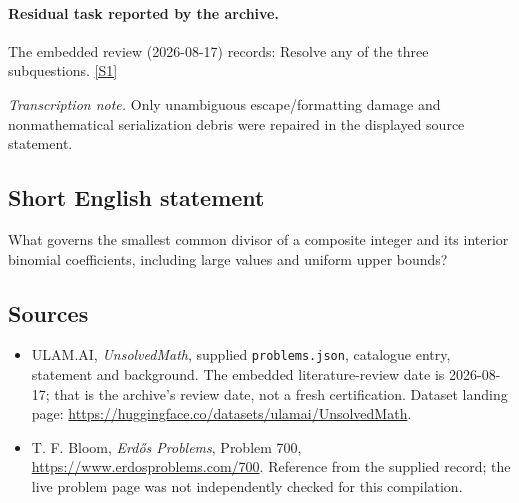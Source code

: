 \documentclass[11pt,a4paper]{article}
\newcommand{\sref}[2]{\hyperlink{source:#1:#2}{[S#2]}}
\begin{document}
\paragraph{Residual task reported by the archive.}

The embedded review (2026-08-17) records: Resolve any of the three subquestions. \sref{statement}{1}

{\small\emph{Transcription note.} Only unambiguous escape/formatting damage and nonmathematical serialization debris were repaired in the displayed source statement.}

\subsection{Short English statement}

What governs the smallest common divisor of a composite integer and its interior binomial coefficients, including large values and uniform upper bounds?

\subsection{Sources}

{\small

\begin{itemize}

\item[\hypertarget{source:statement:1}{S1}] ULAM.AI, \emph{UnsolvedMath}, supplied \texttt{problems.json}, catalogue entry, statement and background. The embedded literature-review date is 2026-08-17; that is the archive’s review date, not a fresh certification. Dataset landing page: \url{https://huggingface.co/datasets/ulamai/UnsolvedMath}.

\item[\hypertarget{source:statement:2}{S2}] T. F. Bloom, \emph{Erdős Problems}, Problem 700, \url{https://www.erdosproblems.com/700}. Reference from the supplied record; the live problem page was not independently checked for this compilation.

\end{itemize}

}

\label{end:statement}
\end{document}

